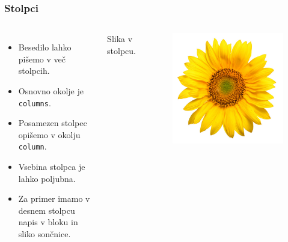 \documentclass{beamer}
\begin{document}
\begin{frame}
      \frametitle{Stolpci}

\begin{columns}
            \begin{itemize}         
                        \item Besedilo lahko pišemo v več stolpcih.
                        \item Osnovno okolje je \texttt{columns}.
                        \item Posamezen stolpec opišemo v okolju \texttt{column}.
                        \item Vsebina stolpca je lahko poljubna.
                        \item Za primer imamo v desnem stolpcu napis v bloku in sliko sončnice.                        
            \end{itemize}
         \begin{exampleblock}
            
            Slika v stolpcu.
         \end{exampleblock}
         \begin{figure}
            \includegraphics{soncnica.jpg}
         \end{figure}
\end{columns}
\end{frame}
\end{document}
